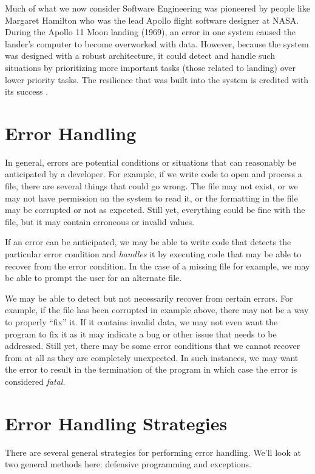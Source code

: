Much of what we now consider Software Engineering was
pioneered by people like Margaret Hamilton who was the
lead Apollo flight software designer at NASA.  During the Apollo 
11 Moon landing (1969), an error in one system 
caused the lander's computer to become overworked with
data.  However, because the system was designed with a
robust architecture, it could detect and handle such situations
by prioritizing more important tasks (those related to landing)
over lower priority tasks.  The resilience that was built into
the system is credited with its success \cite{hamiltonApollo11}.


\section{Error Handling}

In general, errors are potential conditions or situations 
that can reasonably be anticipated by a developer.  For
example, if we write code to open and process a file, 
there are several things that could go wrong.  The file
may not exist, or we may not have permission on the system to read
it, or the formatting in the file may be corrupted or not
as expected.  Still yet, everything could be fine with the
file, but it may contain erroneous or invalid values.

If an error can be anticipated, we may be able to write
code that detects the particular error condition and
\emph{handles} it by executing code that may be
able to recover from the error condition.  In the case of
a missing file for example, we may be able to prompt the 
user for an alternate file.  

We may be able to detect but not necessarily recover from
certain errors.  For example, if the file has been corrupted
in example above, there may not be a way to properly 
``fix'' it.  If it contains invalid data, we may not even want
the program to fix it as it may indicate a bug or other issue
that needs to be addressed.  Still yet, there may be some
error conditions that we cannot recover from at all as they
are completely unexpected.  In such instances, we may
want the error to result in the termination of the program
in which case the error is considered 
\emph{fatal}.  

\section{Error Handling Strategies}

There are several general strategies for performing error
handling.  We'll look at two general methods here: defensive
programming and exceptions.

